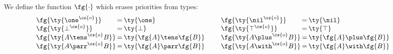 \begin{definition}\label{def:cccp-fg}
  We define the function $\fg{\cdot}$ which erases priorities from types:
  \begin{gather*}
    \setlength{\arraycolsep}{1pt}
    \begin{array}{lclclcl}
      {}\fg{\ty{\one^{\cs{o}}}}      & = & \ty{\one} & \qquad
      & \fg{\ty{\nil^{\cs{o}}}}      & = & \ty{\nil} \\
      {}\fg{\ty{\bot^{\cs{o}}}}      & = & \ty{\bot} & \qquad
      & \fg{\ty{\top^{\cs{o}}}}      & = & \ty{\top} \\ 
      {}\fg{\ty{A \tens^{\cs{o}} B}} & = & \ty{\fg{A} \tens \fg{B}} & \qquad
      & \fg{\ty{A \plus^{\cs{o}} B}} & = & \ty{\fg{A} \plus \fg{B}} \\
      {}\fg{\ty{A \parr^{\cs{o}} B}} & = & \ty{\fg{A} \parr \fg{B}} & \qquad
      & \fg{\ty{A \with^{\cs{o}} B}} & = & \ty{\fg{A} \with \fg{B}}
    \end{array}
  \end{gather*}
\end{definition}
